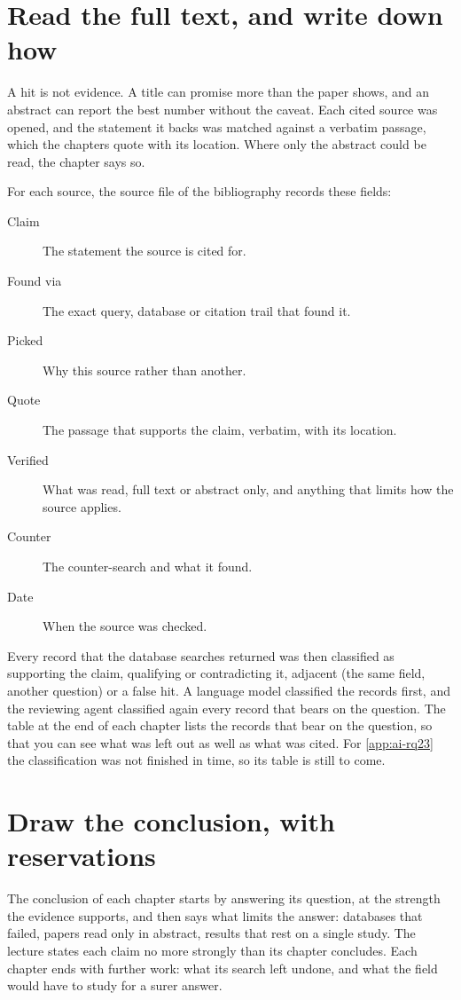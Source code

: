 \section{Read the full text, and write down how}

A hit is not evidence.
A title can promise more than the paper shows, and an abstract can report the
best number without the caveat.
Each cited source was opened, and the statement it backs was matched against a
verbatim passage, which the chapters quote with its location.
Where only the abstract could be read, the chapter says so.

For each source, the source file of the bibliography records these fields:
\begin{description}
  \item[Claim] The statement the source is cited for.
  \item[Found via] The exact query, database or citation trail that found it.
  \item[Picked] Why this source rather than another.
  \item[Quote] The passage that supports the claim, verbatim, with its
    location.
  \item[Verified] What was read, full text or abstract only, and anything that
    limits how the source applies.
  \item[Counter] The counter-search and what it found.
  \item[Date] When the source was checked.
\end{description}

Every record that the database searches returned was then classified as
supporting the claim, qualifying or contradicting it, adjacent (the same field,
another question) or a false hit.
A language model classified the records first, and the reviewing agent
classified again every record that bears on the question.
The table at the end of each chapter lists the records that bear on the
question, so that you can see what was left out as well as what was cited.
For \cref{app:ai-rq23} the classification was not finished in time, so its
table is still to come.

\section{Draw the conclusion, with reservations}

The conclusion of each chapter starts by answering its question, at the
strength the evidence supports, and then says what limits the answer:
databases that failed, papers read only in abstract, results that rest on a
single study.
The lecture states each claim no more strongly than its chapter concludes.
Each chapter ends with further work: what its search left undone, and what the
field would have to study for a surer answer.

